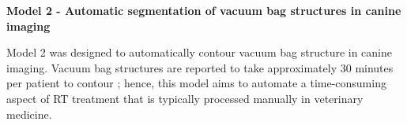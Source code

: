 \textbf{Model 2 - Automatic segmentation of vacuum bag structures in canine imaging}

Model 2 was designed to automatically contour vacuum bag structure in canine imaging. Vacuum bag structures are reported to take approximately 30 minutes per patient to contour \cite{CITATION}; hence, this model aims to automate a time-consuming aspect of RT treatment that is typically processed manually in veterinary medicine.



